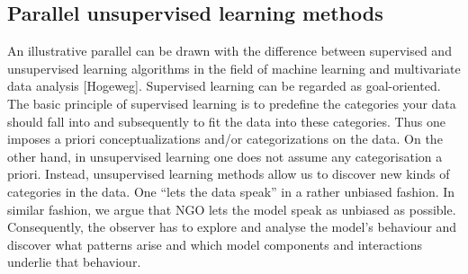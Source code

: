 \subsection{Parallel unsupervised learning methods}

An illustrative parallel can be drawn with the difference between supervised and unsupervised learning algorithms in the field of machine learning and multivariate data analysis [Hogeweg]. Supervised learning can be regarded as goal-oriented. The basic principle of supervised learning is to predefine the categories your data should fall into and subsequently to fit the data into these categories. Thus one imposes a priori conceptualizations and/or categorizations on the data. On the other hand, in unsupervised learning one does not assume any categorisation a priori. Instead, unsupervised learning methods allow us to discover new kinds of categories in the data. One “lets the data speak” in a rather unbiased fashion. In similar fashion, we argue that NGO lets the model speak as unbiased as possible. Consequently, the observer has to explore and analyse the model’s behaviour and discover what patterns arise and which model components and interactions underlie that behaviour.